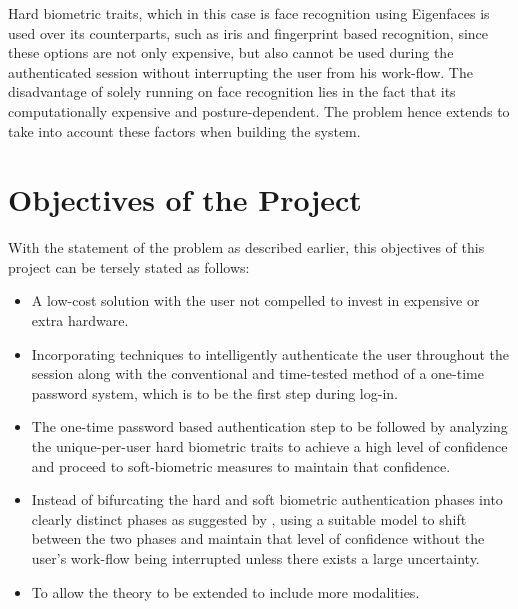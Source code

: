 \documentclass[12pt]{report}			%
\begin{document}
Hard biometric traits, which in this case is face recognition using Eigenfaces\cite{Turk91} is used over its counterparts, such as iris and fingerprint based recognition, since these options are not only expensive, but also cannot be used during the authenticated session without interrupting the user from his work-flow. 
The disadvantage of solely running on face recognition lies in the fact that its computationally expensive and posture-dependent. The problem hence extends to take into account these factors when building the system.

\section{ Objectives of the Project }
With the statement of the problem as described earlier, this objectives of this project can be tersely stated as follows:
\begin{itemize}
\item A low-cost solution with the user not compelled to invest in expensive or extra hardware.
\item Incorporating techniques to intelligently authenticate the user throughout the session along with the conventional and time-tested method of a one-time password system, which is to be the first step during log-in.
\item The one-time password based authentication step to be followed by analyzing the unique-per-user hard biometric traits to achieve a high level of confidence and proceed to soft-biometric measures to maintain that confidence.
\item Instead of bifurcating the hard and soft biometric authentication phases into clearly distinct phases as suggested by \cite{Niin10}, using a suitable model to shift between the two phases and maintain that level of confidence without the user's work-flow being interrupted unless there exists a large uncertainty.
\item To allow the theory to be extended to include more modalities.
\end{itemize}
\end{document}
